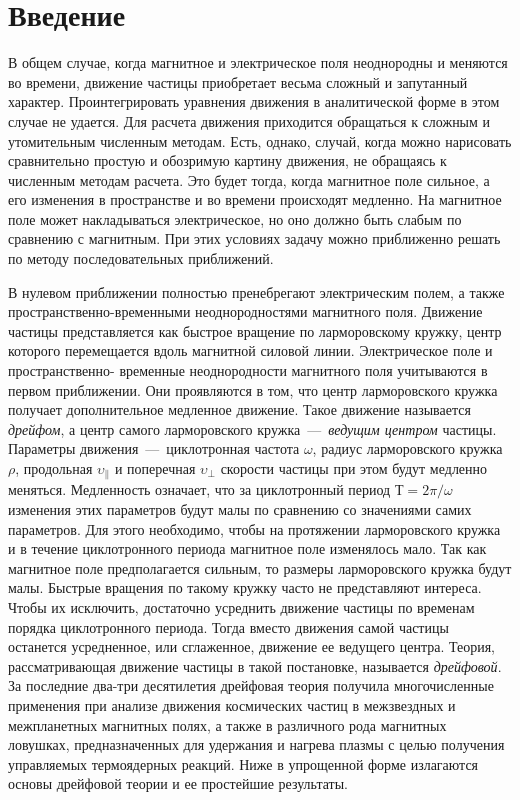 \section{Введение} 

В общем случае, когда магнитное и электрическое поля неоднородны и меняются во времени, движение частицы приобретает весьма сложный и запутанный характер. Проинтегрировать уравнения движения в аналитической форме в этом случае не удается. Для расчета движения приходится обращаться к сложным и утомительным численным методам. Есть, однако, случай, когда можно нарисовать сравнительно 
простую и обозримую картину движения, не обращаясь к численным методам расчета. Это будет тогда, когда магнитное поле сильное, а его изменения в пространстве и во времени происходят медленно. На магнитное поле может накладываться электрическое, но оно должно быть слабым по сравнению с магнитным. При этих условиях задачу можно приближенно решать по методу последовательных приближений.

В нулевом приближении полностью пренебрегают электрическим 
полем, а также пространственно-временными неоднородностями магнитного поля. Движение частицы представляется как быстрое вращение по ларморовскому кружку, центр которого перемещается вдоль 
магнитной силовой линии. Электрическое поле и пространственно- 
временные неоднородности магнитного поля учитываются в первом 
приближении. Они проявляются в том, что центр ларморовского кружка получает дополнительное медленное движение. Такое движение называется \textit{дрейфом}, а центр самого ларморовского кружка~---~\textit{ведущим центром} частицы. Параметры движения~---~циклотронная частота $\omega$, радиус ларморовского кружка $\rho$, продольная $\upsilon_{\parallel}$ и поперечная $\upsilon_{\perp}$ скорости частицы при этом будут медленно меняться. Медленность означает, 
что за циклотронный период $Т = 2\pi/\omega$ изменения этих параметров 
будут малы по сравнению со значениями самих параметров. Для этого 
необходимо, чтобы на протяжении ларморовского кружка и в течение циклотронного периода магнитное поле изменялось мало. Так как магнитное поле предполагается сильным, то размеры ларморовского 
кружка будут малы. Быстрые вращения по такому кружку часто не представляют интереса. Чтобы их исключить, достаточно усреднить движение частицы по временам порядка циклотронного периода. Тогда 
вместо движения самой частицы останется усредненное, или сглаженное, движение ее ведущего центра. Теория, рассматривающая движение частицы в такой постановке, называется \textit{дрейфовой}. За последние два-три десятилетия дрейфовая теория получила многочисленные применения при анализе движения космических частиц в межзвездных 
и межпланетных магнитных полях, а также в различного рода магнитных ловушках, предназначенных для удержания и нагрева плазмы 
с целью получения управляемых термоядерных реакций. Ниже в упрощенной форме излагаются основы дрейфовой теории и ее простейшие 
результаты. 
 
